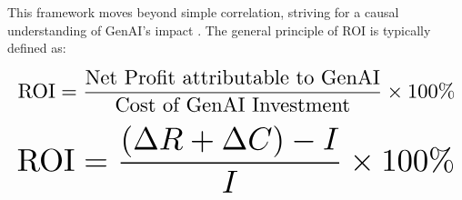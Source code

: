 \documentclass[10pt,twocolumn,letterpaper]{article}
\begin{document}
This framework moves beyond simple correlation, striving for a causal understanding of GenAI's impact \cite{crossref_10_2139_ssrn_6374778,crossref_10_2139_ssrn_5401053,crossref_10_63282_3050_922x_ijeret_v6i3p121}. The general principle of ROI is typically defined as:































\begin{equation}
\resizebox{\columnwidth}{!}{$\displaystyle
\begin{aligned}
\text{ROI} = \frac{\text{Net Profit attributable to GenAI}}{\text{Cost of GenAI Investment}} \times 100\%
\end{aligned}
$}
\end{equation}



















































\begin{equation}
\resizebox{\columnwidth}{!}{$\displaystyle
\begin{aligned}
\text{ROI} = \frac{(\Delta R + \Delta C) - I}{I} \times 100\%
\end{aligned}
$}
\end{equation}
\end{document}
